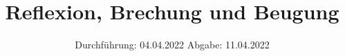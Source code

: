 

\subject{VERSUCH 400}
\title{Reflexion, Brechung und Beugung}
\date{%
  Durchführung: 04.04.2022
  \hspace{3em}
  Abgabe: 11.04.2022
}



\maketitle
\thispagestyle{empty}
\tableofcontents
\newpage








\printbibliography{}


